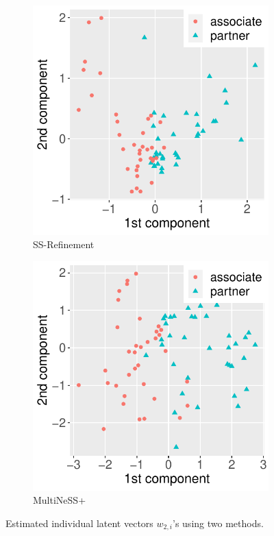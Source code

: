 \documentclass[12pt]{article}
\begin{document}
\begin{figure}[htbp!]
\centering
\begin{subfigure}{0.28\textwidth}
	\centering
	\includegraphics[width=1\linewidth]{Figures/Law_W2.pdf}
    \caption{SS-Refinement}
\end{subfigure}\quad 
\begin{subfigure}{0.28\textwidth}
	\centering
	\includegraphics[width=1\linewidth]{Figures/Lawp_W2.pdf}
    \caption{MultiNeSS+}
\end{subfigure}
\caption{Estimated individual latent vectors $w_{2,i}$'s  using two methods.}
\label{fig:estW2}
\end{figure}
\end{document}
